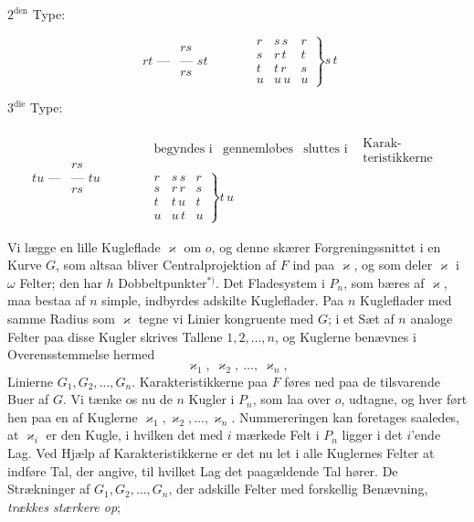 \documentclass{article}
\begin{document}
\begin{center}
$2^{\text{den}}$ Type:
\end{center}
\[
\begin{array}{c|c}
& rs \\
rt\text{ ---} & \text{--- } st \\
& rs
\end{array}
\qquad\quad
\left.
\begin{array}{ccc}
r & s\,s & r \\
s & r\,t & t \\
t & t\,r & s \\
u & u\,u & u
\end{array}
\right\} s\,t
\]

\begin{center}
$3^{\text{die}}$ Type:
\end{center}
\[
\begin{array}{c|c}
& rs \\
tu\text{ ---} & \text{--- } tu \\
& rs
\end{array}
\qquad\quad
\begin{array}{c}
\begin{array}{cccc}
\text{begyndes i} & \text{gennemløbes} & \text{sluttes i} & \begin{array}{c}\text{Karak-}\\\text{teristikkerne}\end{array}
\end{array} \\
\left.
\begin{array}{ccc}
r & s\,s & r \\
s & r\,r & s \\
t & t\,u & t \\
u & u\,t & u
\end{array}
\right\} t\,u
\end{array}
\]

Vi lægge en lille Kugleflade $\varkappa$ om $o$, og denne skærer Forgreningssnittet i en Kurve $G$, som altsaa bliver Centralprojektion af $F$ ind paa $\varkappa$, og som deler $\varkappa$ i $\omega$ Felter; den har $h$ Dobbeltpunkter${}^{*)}$. Det Fladesystem i $P_n$, som bæres af $\varkappa$, maa bestaa af $n$ simple, indbyrdes adskilte Kugleflader. Paa $n$ Kugleflader med samme Radius som $\varkappa$ tegne vi Linier kongruente med $G$; i et Sæt af $n$ analoge Felter paa disse Kugler skrives Tallene $1, 2, \dots, n$, og Kuglerne benævnes i Overensstemmelse hermed
\[
\varkappa_1, \ \varkappa_2, \ \dots, \ \varkappa_n,
\]
Linierne $G_1, G_2, \dots, G_n$. Karakteristikkerne paa $F$ føres ned paa de tilsvarende Buer af $G$. Vi tænke os nu de $n$ Kugler i $P_n$, som laa over $o$, udtagne, og hver ført hen paa en af Kuglerne $\varkappa_1, \varkappa_2, \dots, \varkappa_n$. Nummereringen kan foretages saaledes, at $\varkappa_i$ er den Kugle, i hvilken det med $i$ mærkede Felt i $P_n$ ligger i det $i$'ende Lag. Ved Hjælp af Karakteristikkerne er det nu let i alle Kuglernes Felter at indføre Tal, der angive, til hvilket Lag det paagældende Tal hører. De Strækninger af $G_1, G_2, \dots, G_n$, der adskille Felter med forskellig Benævning, \emph{trækkes stærkere op};
\end{document}
